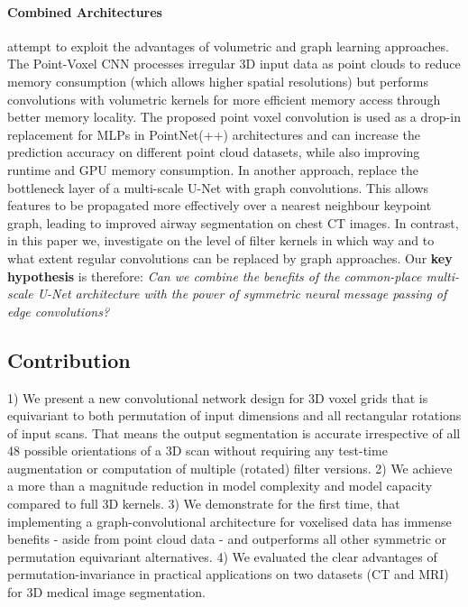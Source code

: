         \paragraph{Combined Architectures} attempt to exploit the advantages of volumetric and graph learning approaches. The Point-Voxel CNN \citep{liu2019point} processes irregular 3D input data as point clouds to reduce memory consumption (which allows higher spatial resolutions) but performs convolutions with volumetric kernels for more efficient memory access through better memory locality. The proposed point voxel convolution is used as a drop-in replacement for MLPs in PointNet(++) architectures and can increase the prediction accuracy on different point cloud datasets, while also improving runtime and GPU memory consumption. In another approach, \citep{garcia2019joint} replace the bottleneck layer of a multi-scale U-Net with graph convolutions. This allows features to be propagated more effectively over a nearest neighbour keypoint graph, leading to improved airway segmentation on chest CT images.
        In contrast, in this paper we, investigate on the level of filter kernels in which way and to what extent regular convolutions can be replaced by graph approaches. Our \textbf{key hypothesis} is therefore: \textit{Can we combine the benefits of the common-place multi-scale U-Net architecture with the power of symmetric neural message passing of edge convolutions?}

    \subsection{Contribution} 1) We present a new convolutional network design for 3D voxel grids that is equivariant to both permutation of input dimensions and all rectangular rotations of input scans. That means the output segmentation is accurate irrespective of all 48 possible orientations of a 3D scan without requiring any test-time augmentation or computation of multiple (rotated) filter versions. 2) We achieve a more than a magnitude reduction in model complexity and model capacity compared to full 3D kernels. 3)  We demonstrate for the first time, that implementing a graph-convolutional architecture for voxelised data has immense benefits - aside from point cloud data - and outperforms all other symmetric or permutation equivariant alternatives. 4) We evaluated the clear advantages of permutation-invariance in practical applications on two datasets (CT and MRI) for 3D medical image segmentation.



